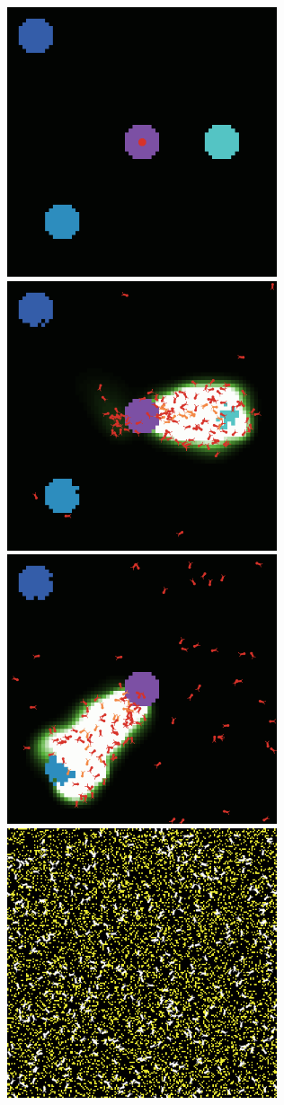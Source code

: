 \documentclass{article}
\begin{document}
\begin{enumerate}
\includegraphics[width=300px]{Ants1.png}\\
\includegraphics[width=300px]{Ants2.png}\\
\includegraphics[width=300px]{Ants3.png}\\
\includegraphics[width=300px]{Termites1.png}\\

\end{enumerate}
\end{document}
